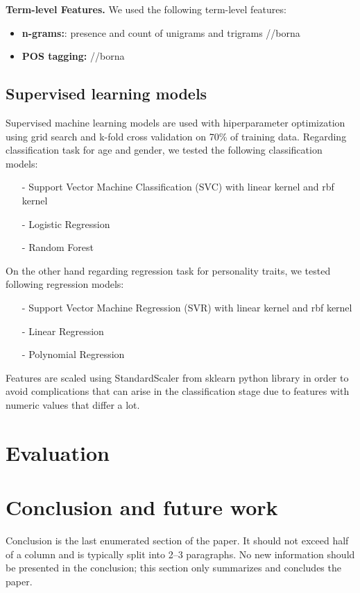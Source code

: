 \documentclass[10pt, a4paper]{article}
\begin{document}
\textbf{Term-level Features.} We used the following term-level features:
\begin{itemize}[noitemsep,nolistsep] 
\item \textbf{n-grams:}: presence and count of unigrams and trigrams //borna
\item \textbf{POS tagging:} //borna
\end{itemize}

\subsection{Supervised learning models}

Supervised machine learning models are used with hiperparameter optimization using grid search and k-fold cross validation on  70\% of training data. Regarding classification task for age and gender, we tested the following classification models: 
\begin{itemize}
	\item[-] Support Vector Machine Classification (SVC) with linear kernel and rbf kernel
	\item[-] Logistic Regression
	\item[-] Random Forest
\end{itemize}

On the other hand regarding regression task for personality traits, we tested following regression models:  
\begin{itemize}
	\item[-] Support Vector Machine Regression (SVR) with linear kernel and rbf kernel
	\item[-] Linear Regression
	\item[-] Polynomial Regression	
\end{itemize}

Features are scaled using StandardScaler from sklearn python library in order to avoid complications that can arise in the classification stage due to features with numeric values that differ a lot.


\section{Evaluation}



\section{Conclusion and future work}

Conclusion is the last enumerated section of the paper. It should not exceed half of a column and is typically split into 2--3 paragraphs. No new information should be presented in the conclusion; this section only summarizes and concludes the paper.



 
\end{document}
